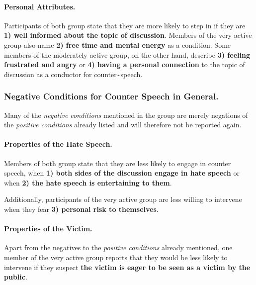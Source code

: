 \documentclass[runningheads]{llncs}
\begin{document}
\hypertarget{personal-attributes.}{%
\paragraph{Personal Attributes.}\label{personal-attributes.}}

Participants of both group state that they are more likely to step in if they are \textbf{1) well informed about the topic of discussion}. Members of the very active group also name \textbf{2) free time and mental energy} as a condition. Some members of the moderately active group, on the other hand, describe \textbf{3) feeling frustrated and angry} or \textbf{4) having a personal connection} to the topic of discussion as a conductor for counter\textasciitilde speech.

\hypertarget{negative-conditions-for-counter-speech-in-general.}{%
\subsubsection{Negative Conditions for Counter Speech in General.}\label{negative-conditions-for-counter-speech-in-general.}}

Many of the \emph{negative conditions} mentioned in the group are merely negations of the \emph{positive conditions} already listed and will therefore not be reported again.

\hypertarget{properties-of-the-hate-speech.-1}{%
\paragraph{Properties of the Hate Speech.}\label{properties-of-the-hate-speech.-1}}

Members of both group state that they are less likely to engage in counter speech, when \textbf{1) both sides of the discussion engage in hate speech} or when
\textbf{2) the hate speech is entertaining to them}.

Additionally, participants of the very active group are less willing to intervene when they fear \textbf{3) personal risk to themselves}.

\hypertarget{properties-of-the-victim.-1}{%
\paragraph{Properties of the Victim.}\label{properties-of-the-victim.-1}}

Apart from the negatives to the \emph{positive conditions} already mentioned, one member of the very active group reports that they would be less likely to intervene if they suspect \textbf{the victim is eager to be seen as a victim by the public}.
\end{document}
